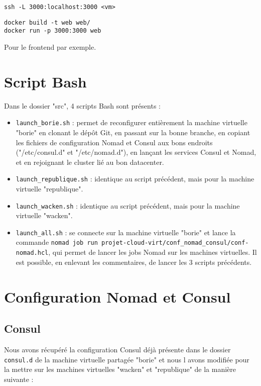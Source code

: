 \documentclass{report}
\begin{document}
\begin{verbatim}
ssh -L 3000:localhost:3000 <vm>
\end{verbatim}

\begin{verbatim}
docker build -t web web/
docker run -p 3000:3000 web
\end{verbatim}

Pour le frontend par exemple.

\newpage

\chapter{Script Bash}
Dans le dossier "src", 4 scripts Bash sont présents :

\begin{itemize}
    \item \texttt{launch\_borie.sh} : permet de reconfigurer entièrement la machine virtuelle "borie" en clonant le dépôt Git, en passant sur la bonne branche, en copiant les fichiers de configuration Nomad et Consul aux bons endroits ("/etc/consul.d" et "/etc/nomad.d"), en lançant les services Consul et Nomad, et en rejoignant le cluster lié au bon datacenter.
    \item \texttt{launch\_republique.sh} : identique au script précédent, mais pour la machine virtuelle "republique".
    \item \texttt{launch\_wacken.sh} : identique au script précédent, mais pour la machine virtuelle "wacken".
    \item \texttt{launch\_all.sh} : se connecte sur la machine virtuelle "borie" et lance la commande \texttt{nomad job run projet-cloud-virt/conf\_nomad\_consul/conf-nomad.hcl}, qui permet de lancer les jobs Nomad sur les machines virtuelles. Il est possible, en enlevant les commentaires, de lancer les 3 scripts précédents.
\end{itemize}

\newpage

\chapter{Configuration Nomad et Consul}

\section{Consul}
Nous avons récupéré la configuration Consul déjà présente dans le dossier \texttt{consul.d} de la machine virtuelle partagée "borie" et nous l avons modifiée pour la mettre sur les machines virtuelles "wacken" et "republique" de la manière suivante :
\end{document}
